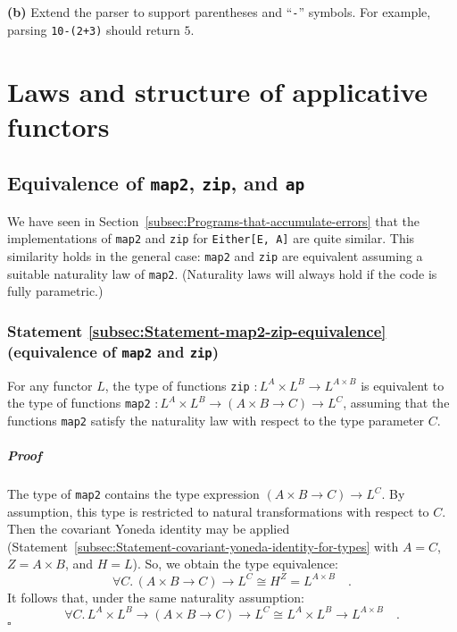 \textbf{(b)} Extend the parser to support parentheses and \textsf{``}\lstinline!-!\textsf{''}
symbols. For example, parsing \lstinline!10-(2+3)! should return
$5$.

\section{Laws and structure of applicative functors}

\subsection{Equivalence of \texttt{map2}, \texttt{zip}, and \texttt{ap}\label{subsec:Equivalence-of-map2-zip-ap}}

We have seen in Section~\ref{subsec:Programs-that-accumulate-errors}
that the implementations of \lstinline!map2! and \lstinline!zip!
for \lstinline!Either[E, A]! are quite similar. This similarity holds
in the general case: \lstinline!map2! and \lstinline!zip! are equivalent
assuming a suitable naturality law of \lstinline!map2!. (Naturality
laws will always hold if the code is fully parametric.)

\subsubsection{Statement \label{subsec:Statement-map2-zip-equivalence}\ref{subsec:Statement-map2-zip-equivalence}
(equivalence of \lstinline!map2! and \lstinline!zip!)}

For any functor $L$, the type of functions \lstinline!zip! $:L^{A}\times L^{B}\rightarrow L^{A\times B}$
is equivalent to the type of functions \lstinline!map2! $:L^{A}\times L^{B}\rightarrow\left(A\times B\rightarrow C\right)\rightarrow L^{C}$,
assuming that the functions \lstinline!map2! satisfy the naturality
law with respect to the type parameter $C$.

\subparagraph{Proof}

The type of \lstinline!map2! contains the type expression $(A\times B\rightarrow C)\rightarrow L^{C}$.
By assumption, this type is restricted to natural transformations
with respect to $C$. Then the covariant Yoneda identity may be applied
(Statement~\ref{subsec:Statement-covariant-yoneda-identity-for-types}
with $A=C$, $Z=A\times B$, and $H=L$). So, we obtain the type equivalence:
\[
\forall C.\,\left(A\times B\rightarrow C\right)\rightarrow L^{C}\cong H^{Z}=L^{A\times B}\quad.
\]
It follows that, under the same naturality assumption:
\[
\forall C.\,L^{A}\times L^{B}\rightarrow\left(A\times B\rightarrow C\right)\rightarrow L^{C}\cong L^{A}\times L^{B}\rightarrow L^{A\times B}\quad.
\]
 $\square$

